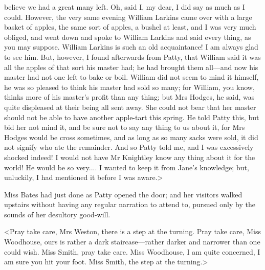believe we had a great many left. Oh, said I, my dear, I did say as much as I could. However, the very same evening William Larkins came over with a large basket of apples, the same sort of apples, a bushel at least, and I was very much obliged, and went down and spoke to William Larkins and said every thing, as you may suppose. William Larkins is such an old acquaintance! I am always glad to see him. But, however, I found afterwards from Patty, that William said it was all the apples of that sort his master had; he had brought them all—and now his master had not one left to bake or boil. William did not seem to mind it himself, he was so pleased to think his master had sold so many; for William, you know, thinks more of his master's profit than any thing; but Mrs Hodges, he said, was quite displeased at their being all sent away. She could not bear that her master should not be able to have another apple-tart this spring. He told Patty this, but bid her not mind it, and be sure not to say any thing to us about it, for Mrs Hodges would be cross sometimes, and as long as so many sacks were sold, it did not signify who ate the remainder. And so Patty told me, and I was excessively shocked indeed! I would not have Mr Knightley know any thing about it for the world! He would be so very.... I wanted to keep it from Jane's knowledge; but, unluckily, I had mentioned it before I was aware.>

Miss Bates had just done as Patty opened the door; and her visitors walked upstairs without having any regular narration to attend to, pursued only by the sounds of her desultory good-will.

<Pray take care, Mrs Weston, there is a step at the turning. Pray take care, Miss Woodhouse, ours is rather a dark staircase—rather darker and narrower than one could wish. Miss Smith, pray take care. Miss Woodhouse, I am quite concerned, I am sure you hit your foot. Miss Smith, the step at the turning.>